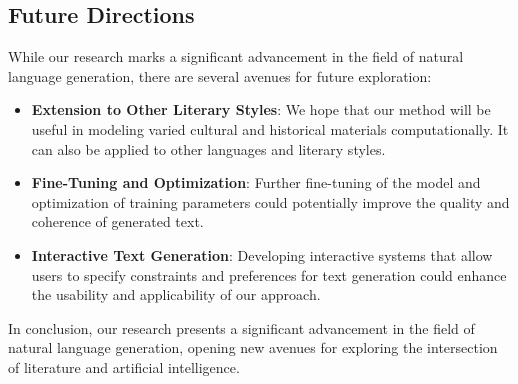 \documentclass[conference]{IEEEtran}
\begin{document}
\subsection{Future Directions}
While our research marks a significant advancement in the field of natural language generation, there are several avenues for future exploration:
\begin{itemize}
    \item \textbf{Extension to Other Literary Styles}: We hope that our method will be useful in modeling varied cultural and historical materials computationally. It can also be applied to other languages and literary styles.
    \item \textbf{Fine-Tuning and Optimization}: Further fine-tuning of the model and optimization of training parameters could potentially improve the quality and coherence of generated text.
    \item \textbf{Interactive Text Generation}: Developing interactive systems that allow users to specify constraints and preferences for text generation could enhance the usability and applicability of our approach.
\end{itemize}

In conclusion, our research presents a significant advancement in the field of natural language generation, opening new avenues for exploring the intersection of literature and artificial intelligence.




\end{document}
